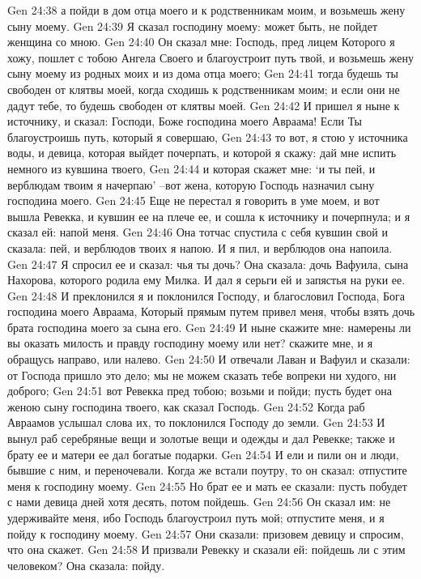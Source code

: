 Gen 24:38  а пойди в дом отца моего и к родственникам моим, и возьмешь жену сыну моему.
Gen 24:39  Я сказал господину моему: может быть, не пойдет женщина со мною.
Gen 24:40  Он сказал мне: Господь, пред лицем Которого я хожу, пошлет с тобою Ангела Своего и благоустроит путь твой, и возьмешь жену сыну моему из родных моих и из дома отца моего;
Gen 24:41  тогда будешь ты свободен от клятвы моей, когда сходишь к родственникам моим; и если они не дадут тебе, то будешь свободен от клятвы моей.
Gen 24:42  И пришел я ныне к источнику, и сказал: Господи, Боже господина моего Авраама! Если Ты благоустроишь путь, который я совершаю,
Gen 24:43  то вот, я стою у источника воды, и девица, которая выйдет почерпать, и которой я скажу: дай мне испить немного из кувшина твоего,
Gen 24:44  и которая скажет мне: `и ты пей, и верблюдам твоим я начерпаю' --вот жена, которую Господь назначил сыну господина моего.
Gen 24:45  Еще не перестал я говорить в уме моем, и вот вышла Ревекка, и кувшин ее на плече ее, и сошла к источнику и почерпнула; и я сказал ей: напой меня.
Gen 24:46  Она тотчас спустила с себя кувшин свой и сказала: пей, и верблюдов твоих я напою. И я пил, и верблюдов она напоила.
Gen 24:47  Я спросил ее и сказал: чья ты дочь? Она сказала: дочь Вафуила, сына Нахорова, которого родила ему Милка. И дал я серьги ей и запястья на руки ее.
Gen 24:48  И преклонился я и поклонился Господу, и благословил Господа, Бога господина моего Авраама, Который прямым путем привел меня, чтобы взять дочь брата господина моего за сына его.
Gen 24:49  И ныне скажите мне: намерены ли вы оказать милость и правду господину моему или нет? скажите мне, и я обращусь направо, или налево.
Gen 24:50  И отвечали Лаван и Вафуил и сказали: от Господа пришло это дело; мы не можем сказать тебе вопреки ни худого, ни доброго;
Gen 24:51  вот Ревекка пред тобою; возьми и пойди; пусть будет она женою сыну господина твоего, как сказал Господь.
Gen 24:52  Когда раб Авраамов услышал слова их, то поклонился Господу до земли.
Gen 24:53  И вынул раб серебряные вещи и золотые вещи и одежды и дал Ревекке; также и брату ее и матери ее дал богатые подарки.
Gen 24:54  И ели и пили он и люди, бывшие с ним, и переночевали. Когда же встали поутру, то он сказал: отпустите меня к господину моему.
Gen 24:55  Но брат ее и мать ее сказали: пусть побудет с нами девица дней хотя десять, потом пойдешь.
Gen 24:56  Он сказал им: не удерживайте меня, ибо Господь благоустроил путь мой; отпустите меня, и я пойду к господину моему.
Gen 24:57  Они сказали: призовем девицу и спросим, что она скажет.
Gen 24:58  И призвали Ревекку и сказали ей: пойдешь ли с этим человеком? Она сказала: пойду.
